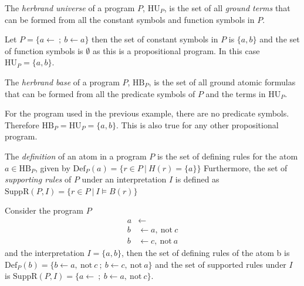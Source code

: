 \begin{definition}
\label{def:herbrand universe}
    The \emph{herbrand universe} of a program $P$, \(\text{HU}_P\), is the set of all \emph{ground terms} that can be formed from all the constant symbols and function symbols in $P$.
\end{definition}

\begin{example}
\label{ex:herbrand universe}
    Let \(P = \{a \leftarrow\ ;\ b \leftarrow a\}\) then the set of constant symbols in $P$ is \(\{a,b\}\) and the set of function symbols is \(\emptyset\) as this is a propositional program. In this case \(\text{HU}_P = \{a,b\}\).
\end{example}

\begin{definition}
\label{def:herbrand base}
    The \emph{herbrand base} of a program $P$, \(\text{HB}_P\), is the set of all ground atomic formulas that can be formed from all the predicate symbols of $P$ and the terms in \(\text{HU}_P\).
\end{definition}

\begin{example}
\label{ex:herbrand base}
    For the program used in the previous example, there are no predicate symbols. Therefore \(\text{HB}_{P} = \text{HU}_{P} = \{a,b\}\). This is also true for any other propositional program. 
\end{example}

The \emph{definition} of an atom in a program $P$ is the set of defining rules for the atom \(a \in \text{HB}_P\), given by
\(
    \text{Def}_P(a) = \{r \in P \ | \ H(r) = \{a\}\}
\)
Furthermore, the set of \emph{supporting rules} of $P$ under an interpretation $I$ is defined as
\(
    \text{SuppR}(P, I) = \{r \in P \ | \ I \models B(r)\}
\)
\begin{example}
\label{ex:def/supp}
    Consider the program $P$
    \begin{align*}
        a &\leftarrow \\
        b &\leftarrow a,\ \text{not}\ c \\
        b &\leftarrow c,\ \text{not}\ a
    \end{align*}
    and the interpretation \(I = \{a, b\}\), then the set of defining rules of the atom b is \(\text{Def}_P(b) = \{b \leftarrow a,\ \text{not}\ c\ ;\ b \leftarrow c,\ \text{not}\ a\}\) and the set of supported rules under $I$ is \(\text{SuppR}(P, I) = \{a \leftarrow\ ;\ b \leftarrow a,\ \text{not}\ c\}\).
\end{example}

